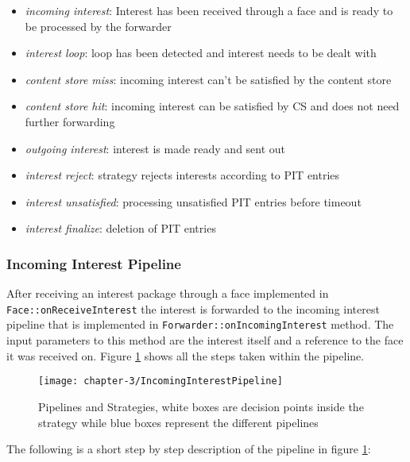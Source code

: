 \begin{itemize}
\item \emph{incoming interest}: Interest has been received through a face and is ready to be processed by the forwarder
\item \emph{interest loop}: loop has been detected and interest needs to be dealt with
\item \emph{content store miss}: incoming interest can't be satisfied by the content store
\item \emph{content store hit}: incoming interest can be satisfied by CS and does not need further forwarding 
\item \emph{outgoing interest}: interest is made ready and sent out
\item \emph{interest reject}: strategy rejects interests according to PIT entries
\item \emph{interest unsatisfied}: processing unsatisfied PIT entries before timeout
\item \emph{interest finalize}: deletion of PIT entries
\end{itemize}

\subsubsection{Incoming Interest Pipeline}

After receiving an interest package through a face implemented in \texttt{Face::onReceiveInterest} the interest is forwarded to the incoming interest pipeline that is implemented in \texttt{Forwarder::onIncomingInterest} method. The input parameters to this method are the interest itself and a reference to the face it was received on. Figure \ref{fig:IncomingInterestPipeline} shows all the steps taken within the pipeline.

\begin{figure}[H]
  \centering
  \texttt{[image: chapter-3/IncomingInterestPipeline]}
  \caption{Pipelines and Strategies, white boxes are decision points inside the strategy while blue boxes represent the different pipelines}
  \label{fig:IncomingInterestPipeline}
\end{figure}

The following is a short step by step description of the pipeline in figure  \ref{fig:IncomingInterestPipeline}:

